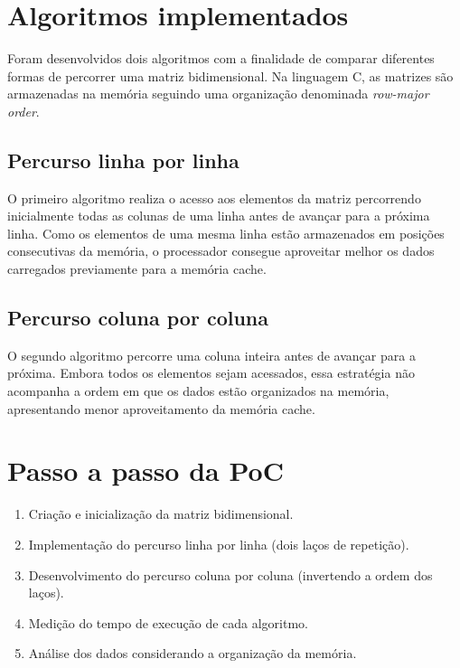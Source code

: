 \section{Algoritmos implementados}
Foram desenvolvidos dois algoritmos com a finalidade de comparar diferentes formas de percorrer uma matriz bidimensional. Na linguagem C, as matrizes são armazenadas na memória seguindo uma organização denominada \textit{row-major order}.

\subsection{Percurso linha por linha}
O primeiro algoritmo realiza o acesso aos elementos da matriz percorrendo inicialmente todas as colunas de uma linha antes de avançar para a próxima linha. Como os elementos de uma mesma linha estão armazenados em posições consecutivas da memória, o processador consegue aproveitar melhor os dados carregados previamente para a memória cache.

\clearpage



\subsection{Percurso coluna por coluna}
O segundo algoritmo percorre uma coluna inteira antes de avançar para a próxima. Embora todos os elementos sejam acessados, essa estratégia não acompanha a ordem em que os dados estão organizados na memória, apresentando menor aproveitamento da memória cache.

\clearpage



\section{Passo a passo da PoC}
\begin{enumerate}
    \item Criação e inicialização da matriz bidimensional.
    \item Implementação do percurso linha por linha (dois laços de repetição).
    \item Desenvolvimento do percurso coluna por coluna (invertendo a ordem dos laços).
    \item Medição do tempo de execução de cada algoritmo.
    \item Análise dos dados considerando a organização da memória.
\end{enumerate}


